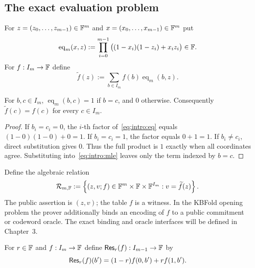 \subsection{The exact evaluation problem}\label{sec:intro:evaluation}

\begin{definition}\label{def:intro:mle}
For $z=(z_0,\ldots,z_{m-1})\in\mathbb{F}^m$ and $x=(x_0,\ldots,x_{m-1})\in\mathbb{F}^m$ put
\begin{equation}\label{eq:intro:eq}
 \operatorname{eq}_m(x,z):=\prod_{i=0}^{m-1}\big((1-x_i)(1-z_i)+x_i z_i\big)\in\mathbb{F}.
\end{equation}
For $f:I_m\to\mathbb{F}$ define
\begin{equation}\label{eq:intro:mle}
 \widetilde f(z):=\sum_{b\in I_m}f(b)\operatorname{eq}_m(b,z).
\end{equation}
\end{definition}

\begin{lemma}\label{lem:intro:interpolation}
For $b,c\in I_m$, $\operatorname{eq}_m(b,c)=1$ if $b=c$, and $0$ otherwise. Consequently $\widetilde f(c)=f(c)$ for every $c\in I_m$.
\end{lemma}
\begin{proof}
If $b_i=c_i=0$, the $i$-th factor of~\eqref{eq:intro:eq} equals $(1-0)(1-0)+0=1$. If $b_i=c_i=1$, the factor equals $0+1=1$. If $b_i\ne c_i$, direct substitution gives $0$. Thus the full product is $1$ exactly when all coordinates agree. Substituting into~\eqref{eq:intro:mle} leaves only the term indexed by $b=c$.
\end{proof}

\begin{definition}\label{def:intro:relation}
Define the algebraic relation
\[
 \mathcal R_{m,\mathbb{F}}:=\left\{(z,v;f)\in\mathbb{F}^m\times\mathbb{F}\times\mathbb{F}^{I_m} : v=\widetilde f(z)\right\}.
\]
The public assertion is $(z,v)$; the table $f$ is a witness. In the KBFold opening problem the prover additionally binds an encoding of $f$ to a public commitment or codeword oracle. The exact binding and oracle interfaces will be defined in Chapter~3.
\end{definition}

\begin{definition}\label{def:intro:restriction}
For $r\in\mathbb{F}$ and $f:I_m\to\mathbb{F}$ define $\mathsf{Res}_r(f):I_{m-1}\to\mathbb{F}$ by
\begin{equation}\label{eq:intro:restriction}
 \mathsf{Res}_r(f)(b')=(1-r)f(0,b')+rf(1,b').
\end{equation}
\end{definition}

